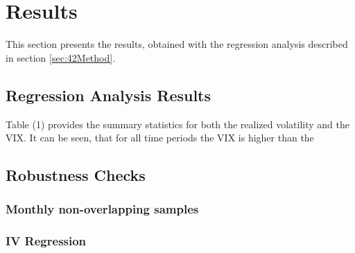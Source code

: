 
\section{Results}\label{sec:5Results}

This section presents the results, obtained with the regression analysis described in section \ref{sec:42Method}. 

\subsection{Regression Analysis Results}\label{sec:51Regression}
Table (1) provides the summary statistics for both the realized volatility and the VIX. It can be seen, that for all time periods the VIX is higher than the 



%

%

%

%


\subsection{Robustness Checks}\label{sec51Robustness}

\subsubsection{Monthly non-overlapping samples}


%

%

%


\subsubsection{IV Regression}
















